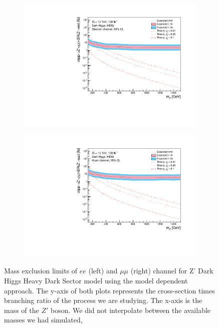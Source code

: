 \documentclass[12pt, a4paper]{book}
\begin{document}
\begin{figure}[!ht]
	\centering
   \begin{subfigure}[b]{0.49\textwidth}
      \centering
      \includegraphics[width=1\textwidth]{Limits/DH_HDS/mass_exclusion_ee.pdf}
      \end{subfigure}
   \hfill
   \begin{subfigure}[b]{0.49\textwidth}
      \centering
      \includegraphics[width=1\textwidth]{Limits/DH_HDS/mass_exclusion_uu.pdf}
      \end{subfigure}
   \caption[Mass exclusion limits of $ee$ and $\mu\mu$ channel for Z' DH HDS model using the model dependent approach]{Mass exclusion limits of $ee$ (left) and $\mu\mu$ (right) channel for Z' Dark Higgs Heavy Dark Sector model using the model dependent approach. The y-axis of both plots represents the cross-section times branching ratio of the process we are studying. The x-axis is the mass of the $Z'$ boson. We did not interpolate between the available masses we had simulated, 
}
\end{figure}
\end{document}
